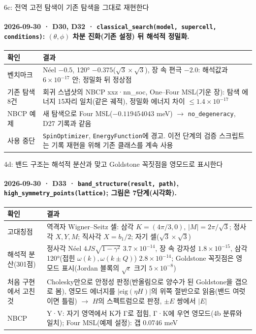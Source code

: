 \begin{frame}[label=stage6c]{6c: 전역 고전 탐색이 기존 탐색을 그대로 재현한다}
  \framesubtitle{2026-09-30 · D30, D32 · \texttt{classical\_search(model, supercell, conditions)}: $(\theta,\phi)$ 차분 진화(기존 설정) 뒤 해석적 정밀화.}
  \footnotesize\renewcommand{\arraystretch}{1.08}
  \begin{tabularx}{\textwidth}{@{}P{3.4cm}Y@{}}
    \toprule
    확인 & 결과 \\
    \midrule
    벤치마크 & Néel $-0.5$, 120° $-0.375$($\sqrt3\times\sqrt3$), 장 속 편극 $-2.0$: 해석값과 $6\times10^{-17}$ 안; 정밀화 뒤 정상점 \\
    기존 탐색 8건 & 회귀 스냅샷의 NBCP xxz·nn\_soc, One--Four MSL(기운 장): 탐색 에너지 15자리 일치(같은 궤적), 정밀화 에너지 차이 $\le1.4\times10^{-17}$ \\
    NBCP 예제 & 새 탐색으로 Four MSL($-0.119454043$ meV) $\to$ \texttt{no\_degeneracy}, D27 기록과 같음 \\
    사용 중단 & \texttt{SpinOptimizer}, \texttt{EnergyFunction}에 경고. 이전 단계의 검증 스크립트는 기록 재현을 위해 기존 클래스를 계속 사용 \\
    \bottomrule
  \end{tabularx}
  \par\smallskip
\end{frame}

\begin{frame}[label=stage4d]{4d: 밴드 구조는 해석적 분산과 맞고 Goldstone 꼭짓점을 영모드로 표시한다}
  \framesubtitle{2026-09-30 · D33 · \texttt{band\_structure(result, path)}, \texttt{high\_symmetry\_points(lattice)}; 그림은 7단계(시각화).}
  \footnotesize\renewcommand{\arraystretch}{1.08}
  \begin{tabularx}{\textwidth}{@{}P{3.3cm}Y@{}}
    \toprule
    확인 & 결과 \\
    \midrule
    고대칭점 & 역격자 Wigner--Seitz 셀: 삼각 $K=(4\pi/3,0)$, $|M|=2\pi/\sqrt3$; 정사각 $X,Y,M$; 직사각 $X=b_1/2$; 자기 셀($\sqrt3\times\sqrt3$) \\
    해석적 분산(301점) & 정사각 Néel $4JS\sqrt{1-\gamma^2}$ $3.7\times10^{-14}$, 장 속 강자성 $1.8\times10^{-15}$, 삼각 120°(접힌 $\omega(k),\omega(k\pm Q)$) $2.8\times10^{-14}$; Goldstone 꼭짓점은 영모드 표시(Jordan 블록의 $\sqrt\epsilon$ 크기 $5\times10^{-8}$) \\
    처음 구현에서 고친 것 & Cholesky만으로 안정성 판정(반올림으로 양수가 된 Goldstone을 갭으로 봄), 영모드 에너지를 $|\mathrm{eig}(\eta H)|$의 위쪽 절반으로 읽음(밴드 여럿이면 틀림) $\to$ $H$의 스펙트럼으로 판정, $\pm E$ 쌍에서 $|E|$ \\
    NBCP & Y·V: 자기 영역에서 K가 Γ로 접힘, Γ·K에 우연 영모드(4b 분류와 일치); Four MSL(예제 설정): 갭 0.0746 meV \\
    \bottomrule
  \end{tabularx}
  \par\smallskip
\end{frame}


